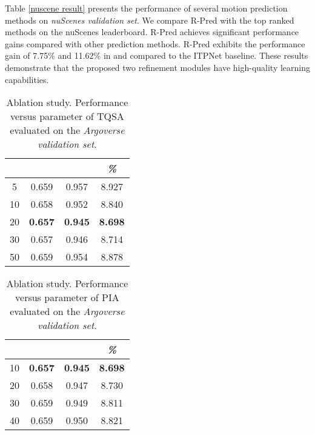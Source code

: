 \documentclass[10pt,twocolumn,letterpaper]{article}
\begin{document}
Table \ref{nuscene result} presents the performance of several motion prediction methods on {\it nuScenes validation set}. We compare R-Pred with the top ranked methods \cite{CoverNet, trajectron++, MHA-JAM, multipath, cxx, LaPred, P2T, THOMAS, PGP} on the nuScenes leaderboard.
R-Pred achieves significant performance gains compared with  other prediction methods. R-Pred exhibits the performance gain of 7.75\% and 11.62\% in  and   compared to the ITPNet baseline. These results demonstrate that the proposed two refinement modules have high-quality learning capabilities.

\begin{table} [ht]
 \centering 
    \begin{tabular}{c||ccc}
    \bottomrule[1.5pt]
        & &   & \textit{\%} \\
         \hline\hline
5 & 0.659 & 0.957  & 8.927   \\
        10 & 0.658 & 0.952  & 8.840   \\
        20 & \textbf{0.657} & \textbf{0.945}  & \textbf{8.698}   \\
        30 & 0.657 & 0.946  & 8.714 \\
50 & 0.659 &  0.954  & 8.878    \\
           \bottomrule[1.5pt]
    \end{tabular}
\vspace{-10.0pt}
    \caption{Ablation study. Performance versus   parameter of TQSA evaluated on the \textit{Argoverse validation set}.}
        \label{th_tqsa} 
\end{table}
\vspace{-15.0pt}
\begin{table} [ht]
 \centering 
    \begin{tabular}{c||ccc}
    \bottomrule[1.5pt]
         & &   & \textit{\%} \\
         \hline\hline
        10 & \textbf{0.657} & \textbf{0.945}  & \textbf{8.698}   \\
        20 & 0.658 & 0.947  & 8.730   \\
        30 & 0.659 & 0.949  & 8.811 \\
        40 &0.659 & 0.950  & 8.821    \\
           \bottomrule[1.5pt]
    \end{tabular}
\vspace{-10.0pt}
    \caption{Ablation study. Performance versus  parameter of PIA evaluated on the \textit{Argoverse validation set}.}
        \label{th_pia} 
\end{table}
\end{document}
